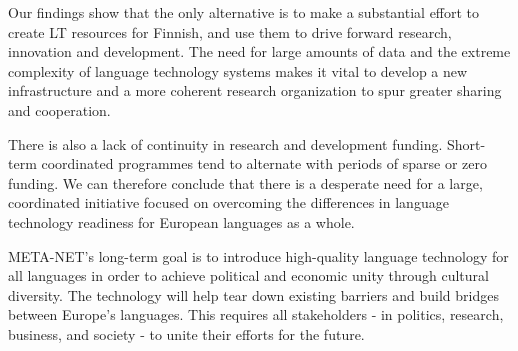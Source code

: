 \documentclass[]{../../metanetpaper}
\begin{document}
\begin{Parallel}[c]{77mm}{77mm}
{Our findings show that the only alternative is to make a substantial
effort to create LT resources for Finnish, and use them to drive
forward research, innovation and development. The need for large
amounts of data and the extreme complexity of language technology
systems makes it vital to develop a new infrastructure and a more
coherent research organization to spur greater sharing and
cooperation.

There is also a lack of continuity in research and development
funding.  Short-term coordinated programmes tend to alternate with
periods of sparse or zero funding. We can therefore conclude that
there is a desperate need for a large, coordinated initiative focused
on overcoming the differences in language technology readiness for
European languages as a whole.

META-NET’s long-term goal is to introduce high-quality language
technology for all languages in order to achieve political and
economic unity through cultural diversity. The technology will help
tear down existing barriers and build bridges between Europe’s
languages. This requires all stakeholders - in politics, research,
business, and society - to unite their efforts for the future.
}

\ParallelPar

\clearpage



\end{Parallel}
\end{document}
